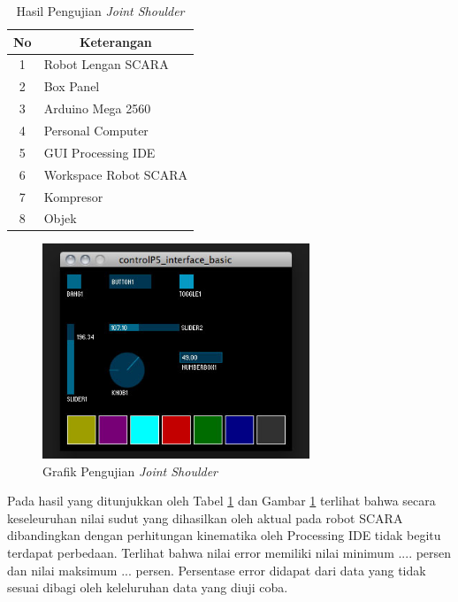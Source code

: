 \begin{table}[H]
	\centering
	\caption{Hasil Pengujian \textit{Joint Shoulder}}
	\label{tbl.jointshoulder}
	\begin{tabular}{|c|l|}
		\hline
		\rowcolor[HTML]{9B9B9B} 
		
		No & \multicolumn{1}{c|}{\cellcolor[HTML]{9B9B9B}Keterangan} \\ \hline
		1  & Robot Lengan SCARA                                      \\ \hline
		2  & Box Panel                                               \\ \hline
		3  & Arduino Mega 2560                                       \\ \hline
		4  & Personal Computer                                       \\ \hline
		5  & GUI Processing IDE                                      \\ \hline
		6  & Workspace Robot SCARA                                   \\ \hline
		7  & Kompresor                                               \\ \hline
		8  & Objek                                                   \\ \hline
	\end{tabular}
	
\end{table} 
\begin{figure}[H]
	\centering
	\includegraphics[width=8cm]{gambar/controlp5.jpg}
	\caption{Grafik Pengujian \textit{Joint Shoulder}}
	\label{pic.jointshoulder}
\end{figure}

Pada hasil yang ditunjukkan oleh Tabel \ref{tbl.jointshoulder} dan Gambar \ref{pic.jointshoulder} terlihat bahwa secara keseleuruhan nilai sudut yang dihasilkan oleh aktual pada robot SCARA dibandingkan dengan perhitungan kinematika oleh Processing IDE tidak begitu terdapat perbedaan. Terlihat bahwa nilai error
 memiliki nilai minimum .... persen dan nilai maksimum ... persen. Persentase error didapat dari data yang tidak sesuai dibagi oleh keleluruhan data yang diuji coba. 
 
